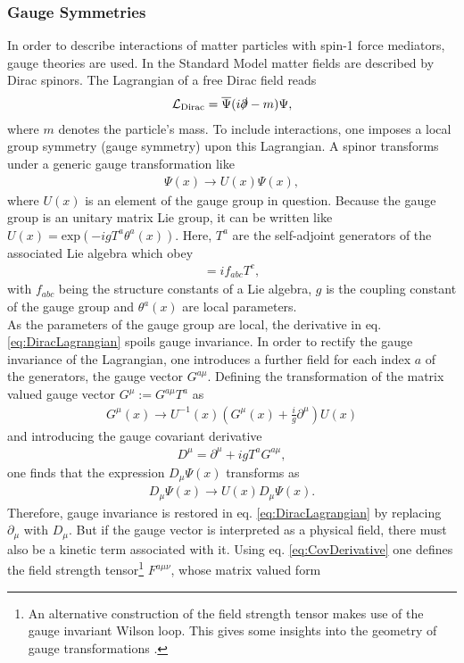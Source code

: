 \subsubsection*{Gauge Symmetries} 
In order to describe interactions of matter particles with spin-1 force mediators, gauge theories are used. In the Standard Model matter fields are described by Dirac spinors. The Lagrangian of a free Dirac field reads
\begin{align}
\mathcal{L}_{\mathrm{Dirac}} = \overline{\Psi} ( i\slashed{\partial} - m)\Psi,\label{eq:DiracLagrangian}
\end{align}
where $m$ denotes the particle's mass. To include interactions, one imposes a local group symmetry (gauge symmetry) upon this Lagrangian. A spinor transforms under a generic gauge transformation like 
\begin{align}
\Psi(x) \to U(x)\Psi(x),
\end{align}
where $U(x)$ is an element of the gauge group in question. Because the gauge group is an unitary matrix Lie group, it can be written like $U(x)=\mathrm{exp}(-igT^a\theta^a(x))$. Here, $T^a$ are the self-adjoint generators of the associated Lie algebra which obey
\begin{align}
[T^a,T^b] = if_{abc}T^c,\label{eq:struc_const}
\end{align}
with $f_{abc}$ being the structure constants of a Lie algebra, $g$ is the coupling constant of the gauge group and $\theta^a(x)$ are local parameters.\\
As the parameters of the gauge group are local, the derivative in eq. \eqref{eq:DiracLagrangian} spoils gauge invariance. In order to rectify the gauge invariance of the Lagrangian, one introduces a further field for each index $a$ of the generators, the gauge vector $G^{a\mu}$. Defining the transformation of the matrix valued gauge vector $G^\mu := G^{a\mu}T^a$ as 
\begin{align}
G^{\mu}(x) \to U^{-1}(x) \left( G^\mu(x) + \frac{i}{g}\partial^\mu \right) U(x)
\end{align}
and introducing the gauge covariant derivative
\begin{align}
D^\mu = \partial^\mu + igT^aG^{a\mu},
\end{align}
one finds that the expression $D_\mu \Psi(x)$ transforms as
\begin{align}
D_\mu \Psi(x) \to U(x) D_\mu \Psi(x). \label{eq:CovDerivative}
\end{align}
Therefore, gauge invariance is restored in eq. \eqref{eq:DiracLagrangian} by replacing $\partial_\mu$ with $D_\mu$. But if the gauge vector is interpreted as a physical field, there must   also be a kinetic term associated with it. Using eq. \eqref{eq:CovDerivative} one defines the field strength tensor\footnote{An alternative construction of the field strength tensor makes use of the gauge invariant Wilson loop. This gives some insights into the geometry of gauge transformations \cite{Peskin}.} $F^{a\mu\nu}$, whose matrix valued form
